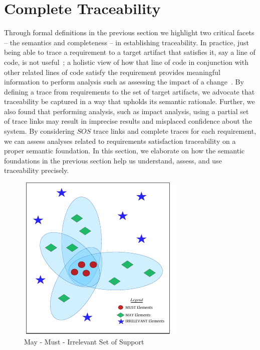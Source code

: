 \section{Complete Traceability}
\label{sec:discussion}

Through formal definitions in the previous section we highlight two critical facets -- the semantics and completeness -- in establishing traceability. In practice, just being able to trace a requirement to a target artifact that satisfies it, say a line of code, is not useful~\cite{guo2015trace}; a holistic view of how that line of code in conjunction with other related lines of code satisfy the requirement provides meaningful information to perform analysis such as assessing the impact of a change~\cite{hull2010requirements}. By defining a trace from requirements to the set of target artifacts, we advocate that traceability be captured in a way that upholds its semantic rationale. Further, we also found that performing analysis, such as impact analysis, using a partial set of trace links may result in imprecise results and misplaced confidence about the system. By considering $SOS$ trace links and complete traces for each requirement, we can assess analyses related to requirements satisfaction traceability on a proper semantic foundation. In this section, we elaborate on how the semantic foundations in the previous section help us understand, assess, and use traceability precisely.



\begin{figure}[htb]
\includegraphics[width=\columnwidth]{images/may_must_1.pdf}
\caption{May - Must - Irrelevant Set of Support}\label{fig:maymust}
\end{figure}


